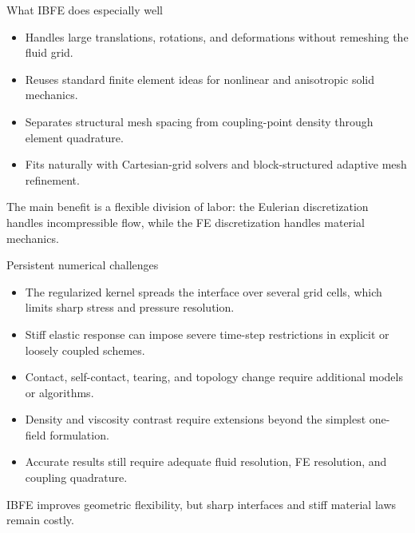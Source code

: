\documentclass[aspectratio=169,11pt]{beamer}
\begin{document}
\begin{frame}{What IBFE does especially well}
\begin{itemize}\itemsep8pt
  \item Handles large translations, rotations, and deformations without remeshing the fluid grid.
  \item Reuses standard finite element ideas for nonlinear and anisotropic solid mechanics.
  \item Separates structural mesh spacing from coupling-point density through element quadrature.
  \item Fits naturally with Cartesian-grid solvers and block-structured adaptive mesh refinement.
\end{itemize}

\vfill
\begin{punchbox}
The main benefit is a flexible division of labor: the Eulerian discretization handles incompressible flow, while the FE discretization handles material mechanics.
\end{punchbox}
\end{frame}

\begin{frame}{Persistent numerical challenges}
\begin{itemize}\itemsep7pt
  \item The regularized kernel spreads the interface over several grid cells, which limits sharp stress and pressure resolution.
  \item Stiff elastic response can impose severe time-step restrictions in explicit or loosely coupled schemes.
  \item Contact, self-contact, tearing, and topology change require additional models or algorithms.
  \item Density and viscosity contrast require extensions beyond the simplest one-field formulation.
  \item Accurate results still require adequate fluid resolution, FE resolution, and coupling quadrature.
\end{itemize}

\medskip
\begin{punchbox}
IBFE improves geometric flexibility, but sharp interfaces and stiff material laws remain costly.
\end{punchbox}
\end{frame}
\end{document}
